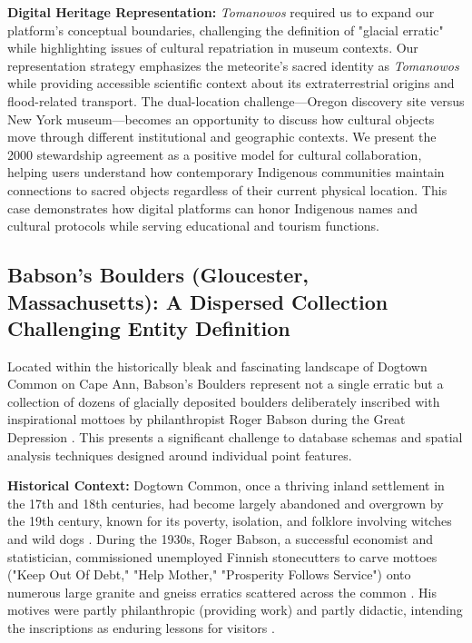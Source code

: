 \textbf{Digital Heritage Representation:} \emph{Tomanowos} required us to expand our platform's conceptual boundaries, challenging the definition of "glacial erratic" while highlighting issues of cultural repatriation in museum contexts. Our representation strategy emphasizes the meteorite's sacred identity as \emph{Tomanowos} while providing accessible scientific context about its extraterrestrial origins and flood-related transport. The dual-location challenge—Oregon discovery site versus New York museum—becomes an opportunity to discuss how cultural objects move through different institutional and geographic contexts. We present the 2000 stewardship agreement as a positive model for cultural collaboration, helping users understand how contemporary Indigenous communities maintain connections to sacred objects regardless of their current physical location. This case demonstrates how digital platforms can honor Indigenous names and cultural protocols while serving educational and tourism functions.

\subsection{Babson's Boulders (Gloucester, Massachusetts): A Dispersed Collection Challenging Entity Definition}
\label{subsec:babson}

Located within the historically bleak and fascinating landscape of Dogtown Common on Cape Ann, Babson's Boulders represent not a single erratic but a collection of dozens of glacially deposited boulders deliberately inscribed with inspirational mottoes by philanthropist Roger Babson during the Great Depression \cite{Moore2005, wburMysteriousBoulders}. This presents a significant challenge to database schemas and spatial analysis techniques designed around individual point features.

\textbf{Historical Context:} Dogtown Common, once a thriving inland settlement in the 17th and 18th centuries, had become largely abandoned and overgrown by the 19th century, known for its poverty, isolation, and folklore involving witches and wild dogs \cite{Moore2005, Babson1940}. During the 1930s, Roger Babson, a successful economist and statistician, commissioned unemployed Finnish stonecutters to carve mottoes ("Keep Out Of Debt," "Help Mother," "Prosperity Follows Service") onto numerous large granite and gneiss erratics scattered across the common \cite{wburMysteriousBoulders}. His motives were partly philanthropic (providing work) and partly didactic, intending the inscriptions as enduring lessons for visitors \cite{Moore2005}.

